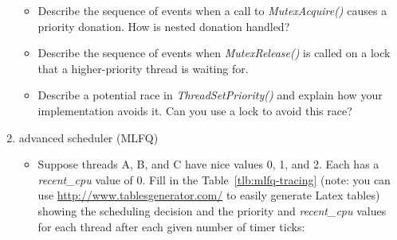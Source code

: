 \begin{enumerate}
\begin{itemize}
            \item Describe the sequence of events when a call to \textit{MutexAcquire()} causes a priority donation.  How is nested donation handled?
            
            \item Describe the sequence of events when \textit{MutexRelease()} is called on a lock that a higher-priority thread is waiting for.
            
            \item Describe a potential race in \textit{ThreadSetPriority()} and explain how your implementation avoids it.  Can you use a lock to avoid this race?
        \end{itemize}

    \item advanced scheduler (MLFQ)
        \begin{itemize}
            \item Suppose threads A, B, and C have nice values 0, 1, and 2. Each has a \textit{recent\_cpu} value of 0.  Fill in the Table~\ref{tlb:mlfq-tracing}  (note: you can use \url{http://www.tablesgenerator.com/} to easily generate Latex tables) showing the scheduling decision and the priority and \textit{recent\_cpu} values for each thread after each given number of timer ticks:


\end{itemize}
\end{enumerate}
